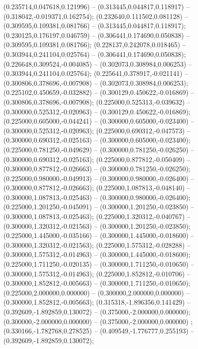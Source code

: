  (0.235714,0.047618,0.121996) -- (0.313445,0.044817,0.118917) -- (0.318042,-0.019371,0.162754);
 (0.232640,0.111502,0.081128) -- (0.309595,0.109381,0.081766) -- (0.313445,0.044817,0.118917);
 (0.230125,0.176197,0.046759) -- (0.306441,0.174690,0.050838) -- (0.309595,0.109381,0.081766);
 (0.228137,0.242078,0.018465) -- (0.303944,0.241104,0.025764) -- (0.306441,0.174690,0.050838);
 (0.226648,0.309524,-0.004085) -- (0.302073,0.308984,0.006253) -- (0.303944,0.241104,0.025764);
 (0.225641,0.378917,-0.021141) -- (0.300806,0.378696,-0.007908) -- (0.302073,0.308984,0.006253);
 (0.225102,0.450659,-0.032882) -- (0.300129,0.450622,-0.016869) -- (0.300806,0.378696,-0.007908);
 (0.225000,0.525313,-0.039632) -- (0.300000,0.525312,-0.020963) -- (0.300129,0.450622,-0.016869);
 (0.225000,0.605000,-0.044241) -- (0.300000,0.605000,-0.023400) -- (0.300000,0.525312,-0.020963);
 (0.225000,0.690312,-0.047573) -- (0.300000,0.690312,-0.025163) -- (0.300000,0.605000,-0.023400);
 (0.225000,0.781250,-0.049629) -- (0.300000,0.781250,-0.026250) -- (0.300000,0.690312,-0.025163);
 (0.225000,0.877812,-0.050409) -- (0.300000,0.877812,-0.026663) -- (0.300000,0.781250,-0.026250);
 (0.225000,0.980000,-0.049913) -- (0.300000,0.980000,-0.026400) -- (0.300000,0.877812,-0.026663);
 (0.225000,1.087813,-0.048140) -- (0.300000,1.087813,-0.025463) -- (0.300000,0.980000,-0.026400);
 (0.225000,1.201250,-0.045091) -- (0.300000,1.201250,-0.023850) -- (0.300000,1.087813,-0.025463);
 (0.225000,1.320312,-0.040767) -- (0.300000,1.320312,-0.021563) -- (0.300000,1.201250,-0.023850);
 (0.225000,1.445000,-0.035166) -- (0.300000,1.445000,-0.018600) -- (0.300000,1.320312,-0.021563);
 (0.225000,1.575312,-0.028288) -- (0.300000,1.575312,-0.014963) -- (0.300000,1.445000,-0.018600);
 (0.225000,1.711250,-0.020135) -- (0.300000,1.711250,-0.010650) -- (0.300000,1.575312,-0.014963);
 (0.225000,1.852812,-0.010706) -- (0.300000,1.852812,-0.005663) -- (0.300000,1.711250,-0.010650);
 (0.225000,2.000000,0.000000) -- (0.300000,2.000000,0.000000) -- (0.300000,1.852812,-0.005663);
 (0.315318,-1.896356,0.141429) -- (0.392609,-1.892859,0.130072) -- (0.375000,-2.000000,0.000000);
 (0.300000,-2.000000,0.000000) -- (0.375000,-2.000000,0.000000) ;
 (0.330166,-1.782768,0.278525) -- (0.409549,-1.776777,0.255193) -- (0.392609,-1.892859,0.130072);
